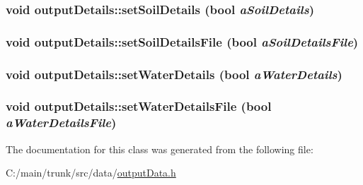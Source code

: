 \label{classoutput_details_ae8d2954fa3d710ed6ef777a9ca07cae1}
\hypertarget{classoutput_details_a7bfd3d4deeeb9664454f8f823cbf2ac3}{
\subsubsection[{setSoilDetails}]{\setlength{\rightskip}{0pt plus 5cm}void outputDetails::setSoilDetails (bool {\em aSoilDetails})}}
\label{classoutput_details_a7bfd3d4deeeb9664454f8f823cbf2ac3}
\hypertarget{classoutput_details_a4a9ea8a53503ed711798cfd8be13126e}{
\subsubsection[{setSoilDetailsFile}]{\setlength{\rightskip}{0pt plus 5cm}void outputDetails::setSoilDetailsFile (bool {\em aSoilDetailsFile})}}
\label{classoutput_details_a4a9ea8a53503ed711798cfd8be13126e}
\hypertarget{classoutput_details_aba60855f94a9b79b921ecdee6375235c}{
\subsubsection[{setWaterDetails}]{\setlength{\rightskip}{0pt plus 5cm}void outputDetails::setWaterDetails (bool {\em aWaterDetails})}}
\label{classoutput_details_aba60855f94a9b79b921ecdee6375235c}
\hypertarget{classoutput_details_a366b23cde6eda1cce1549f5ff94f2de8}{
\subsubsection[{setWaterDetailsFile}]{\setlength{\rightskip}{0pt plus 5cm}void outputDetails::setWaterDetailsFile (bool {\em aWaterDetailsFile})}}
\label{classoutput_details_a366b23cde6eda1cce1549f5ff94f2de8}


The documentation for this class was generated from the following file:\begin{DoxyCompactItemize}
\item 
C:/main/trunk/src/data/\hyperlink{output_data_8h}{outputData.h}\end{DoxyCompactItemize}

